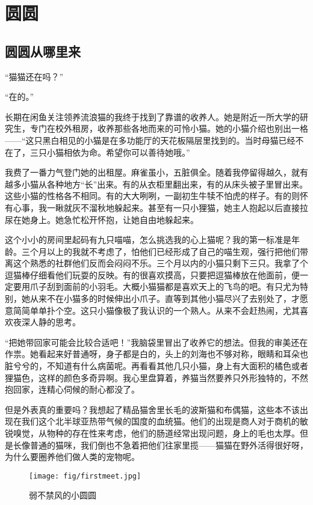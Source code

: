 \chapter{圆圆}

\section{圆圆从哪里来}
\label{sec:yuan-from}

“猫猫还在吗？”

“在的。”

长期在闲鱼关注领养流浪猫的我终于找到了靠谱的收养人。她是附近一所大学的研究生，专门在校外租房，收养那些各地而来的可怜小猫。她的小猫介绍也别出一格——“这只黑白相见的小猫是在多功能厅的天花板隔层里找到的。当时母猫已经不在了，三只小猫相依为命。希望你可以善待她哦。”

我费了一番力气登门她的出租屋。麻雀虽小，五脏俱全。随着我停留得越久，就有越多小猫从各种地方“长”出来。有的从衣柜里翻出来，有的从床头被子里冒出来。这些小猫的性格各不相同。有的大大咧咧，一副初生牛犊不怕虎的样子。有的则怀有心事，我一瞅就灰不溜秋地躲起来。甚至有一只小狸猫，她主人抱起以后直接拉尿在她身上。她急忙松开怀抱，让她自由地躲起来。

这个小小的房间里起码有九只喵喵，怎么挑选我的心上猫呢？我的第一标准是年龄。三个月以上的我就不考虑了，怕他们已经形成了自己的喵生观，强行把他们带离这个熟悉的社群他们反而会闷闷不乐。三个月以内的小猫只剩下三只。我拿了个逗猫棒仔细看他们玩耍的反映。有的很喜欢摸高，只要把逗猫棒放在他面前，便一定要用爪子刮到面前的小羽毛。大概小猫猫都是喜欢天上的飞鸟的吧。有只尤为特别，她从来不在小猫多的时候伸出小爪子。直等到其他小猫尽兴了去别处了，才愿意简简单单扑个空。这只小猫像极了我认识的一个熟人。从来不会赶热闹，尤其喜欢夜深人静的思考。

“把她带回家可能会比较合适吧！”我脑袋里冒出了收养它的想法。但我的审美还在作祟。她看起来好普通呀，身子都是白的，头上的刘海也不够对称，眼睛和耳朵也脏兮兮的，不知道有什么病菌呢。再看看其他几只小猫，身上有大面积的橘色或者狸猫色，这样的颜色多奇异啊。我心里盘算着，养猫当然要养只外形独特的，不然抱回家，连精心伺候的耐心都没了。

但是外表真的重要吗？我想起了精品猫舍里长毛的波斯猫和布偶猫，这些本不该出现在我们这个北半球亚热带气候的国度的血统猫。他们的出现是商人对于商机的敏锐嗅觉，从物种的存在性来考虑，他们的肠道经常出现问题，身上的毛也太厚。但是长像普通的猫咪，我们倒也不急着把他们往家里揽——猫猫在野外活得很好呀，为什么要圈养他们做人类的宠物呢。

\begin{figure}[t]
    \centering
    \texttt{[image: fig/firstmeet.jpg]}
    \caption{弱不禁风的小圆圆}
    \label{firstmeet}
\end{figure}

